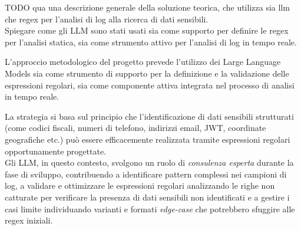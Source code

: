 \documentclass[12pt]{report}
\begin{document}






%
%



TODO qua una descrizione generale della soluzione teorica, che utilizza sia llm che regex per l'analisi di log alla ricerca di dati sensibili. \\
Spiegare come gli LLM sono stati usati sia come supporto per definire le regex per l'analisi statica, sia come strumento attivo per l'analisi di log in tempo reale.



L'approccio metodologico del progetto prevede l'utilizzo dei Large Language Models sia come strumento di supporto per la definizione e la validazione delle espressioni regolari, sia come componente attiva integrata nel processo di analisi in tempo reale.


La strategia si basa sul principio che l'identificazione di dati sensibili strutturati (come codici fiscali, numeri di telefono, indirizzi email, JWT, coordinate geografiche etc.) può essere efficacemente realizzata tramite espressioni regolari opportunamente progettate. \\
Gli LLM, in questo contesto, svolgono un ruolo di \textit{consulenza esperta} durante la fase di sviluppo, contribuendo a identificare pattern complessi nei campioni di log, a validare e ottimizzare le espressioni regolari analizzando le righe non catturate per verificare la presenza di dati sensibili non identificati e a gestire i casi limite individuando varianti e formati \textit{edge-case} che potrebbero sfuggire alle regex iniziali.
\end{document}
